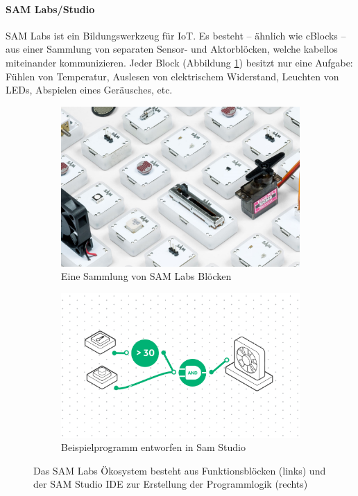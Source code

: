 \paragraph{SAM Labs/Studio} SAM Labs ist ein Bildungswerkzeug für \ac{IoT}. Es besteht -- ähnlich wie cBlocks -- aus einer Sammlung von separaten Sensor- und Aktorblöcken, welche kabellos miteinander kommunizieren. Jeder Block (Abbildung \ref{fig:samlabssub1}) besitzt nur eine Aufgabe: Fühlen von Temperatur, Auslesen von elektrischem Widerstand, Leuchten von LEDs, Abspielen eines Geräusches, etc. 

\begin{figure}[h]
\centering
\begin{subfigure}{.5\textwidth}
  \centering
  \includegraphics[width=.9\linewidth]{bilder/chapter2/samlabs.jpg}
  \caption{Eine Sammlung von SAM Labs Blöcken}
  \label{fig:samlabssub1}
\end{subfigure}%
\begin{subfigure}{.5\textwidth}
  \centering
  \includegraphics[width=.9\linewidth]{bilder/chapter2/samlabside.png}
  \caption{Beispielprogramm entworfen in Sam Studio}
  \label{fig:samlabssub2}
\end{subfigure}
\caption{Das SAM Labs Ökosystem besteht aus Funktionsblöcken (links) und der SAM Studio IDE zur Erstellung der Programmlogik (rechts)}
\label{fig:samlabs}
\end{figure}

